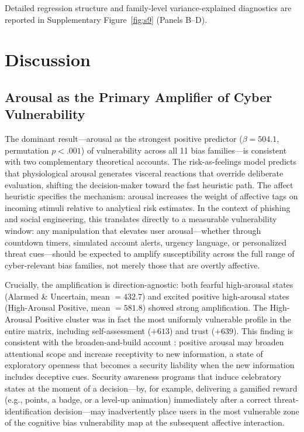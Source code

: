 \documentclass[12pt,a4paper]{article}
\begin{document}
Detailed regression structure and family-level variance-explained diagnostics are reported in Supplementary Figure~\ref{fig:s9} (Panels B--D).

\section{Discussion}

\subsection{Arousal as the Primary Amplifier of Cyber Vulnerability}

The dominant result---arousal as the strongest positive predictor ($\beta = 504.1$, permutation $p < .001$) of vulnerability across all 11 bias families---is consistent with two complementary theoretical accounts. The risk-as-feelings model \citep{loewenstein2001risk} predicts that physiological arousal generates visceral reactions that override deliberate evaluation, shifting the decision-maker toward the fast heuristic path. The affect heuristic \citep{slovic2007affect} specifies the mechanism: arousal increases the weight of affective tags on incoming stimuli relative to analytical risk estimates. In the context of phishing and social engineering, this translates directly to a measurable vulnerability window: any manipulation that elevates user arousal---whether through countdown timers, simulated account alerts, urgency language, or personalized threat cues---should be expected to amplify susceptibility across the full range of cyber-relevant bias families, not merely those that are overtly affective.

Crucially, the amplification is direction-agnostic: both fearful high-arousal states (Alarmed \& Uncertain, mean $= 432.7$) and excited positive high-arousal states (High-Arousal Positive, mean $= 581.8$) showed strong amplification. The High-Arousal Positive cluster was in fact the most uniformly vulnerable profile in the entire matrix, including self-assessment ($+613$) and trust ($+639$). This finding is consistent with the broaden-and-build account \citep{fredrickson2001positive}: positive arousal may broaden attentional scope and increase receptivity to new information, a state of exploratory openness that becomes a security liability when the new information includes deceptive cues. Security awareness programs that induce celebratory states at the moment of a decision---by, for example, delivering a gamified reward (e.g., points, a badge, or a level-up animation) immediately after a correct threat-identification decision---may inadvertently place users in the most vulnerable zone of the cognitive bias vulnerability map at the subsequent affective interaction.
\end{document}
